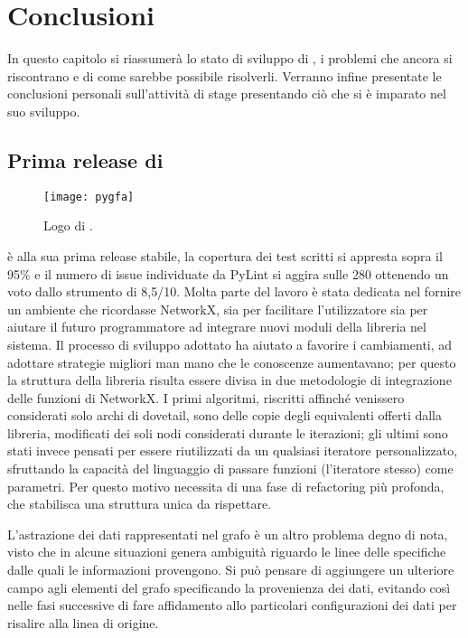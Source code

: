 \chapter{Conclusioni}
In questo capitolo si riassumerà lo stato di sviluppo
di \pygfa, i problemi che ancora si riscontrano e di come
sarebbe possibile risolverli. Verranno infine presentate
le conclusioni personali sull'attività di stage presentando
ciò che si è imparato nel suo sviluppo.

\section{Prima release di \pygfa}
\begin{wrapfigure} {O} {0.4\linewidth}
	\begin{centering}	
		\texttt{[image: pygfa]}
		\caption[Logo di \pygfa]{Logo di \pygfa.}
	\end{centering}
\end{wrapfigure}
\pygfa è alla sua prima release stabile, la copertura dei test
scritti si appresta sopra il 95\% e il numero di issue individuate
da PyLint si aggira sulle 280 ottenendo un voto dallo strumento
di 8,5/10.
Molta parte del lavoro è stata dedicata nel fornire un
ambiente che ricordasse NetworkX, sia per facilitare l'utilizzatore
sia per aiutare il futuro programmatore ad integrare nuovi moduli
della libreria nel sistema.
Il processo di sviluppo adottato ha aiutato a favorire i cambiamenti,
ad adottare strategie migliori man mano che le conoscenze aumentavano;
per questo la struttura della libreria risulta essere divisa in due metodologie
di integrazione delle funzioni di NetworkX. I primi algoritmi, riscritti
affinché venissero considerati solo archi di dovetail, sono delle
copie degli equivalenti offerti dalla libreria, modificati dei soli
nodi considerati durante le iterazioni; gli ultimi
sono stati invece pensati per essere riutilizzati da un qualsiasi iteratore
personalizzato, sfruttando la capacità del linguaggio di passare
funzioni (l'iteratore stesso) come parametri. Per questo motivo
\pygfa necessita di una fase di refactoring più profonda, che stabilisca
una struttura unica da rispettare.

L'astrazione dei dati rappresentati nel grafo è un altro problema
degno di nota, visto che in alcune situazioni genera ambiguità riguardo
le linee delle specifiche dalle quali le informazioni provengono.
Si può pensare di aggiungere un ulteriore campo agli elementi del grafo
specificando la provenienza dei dati, evitando così nelle fasi successive
di fare affidamento allo particolari configurazioni dei dati per risalire
alla linea di origine.

